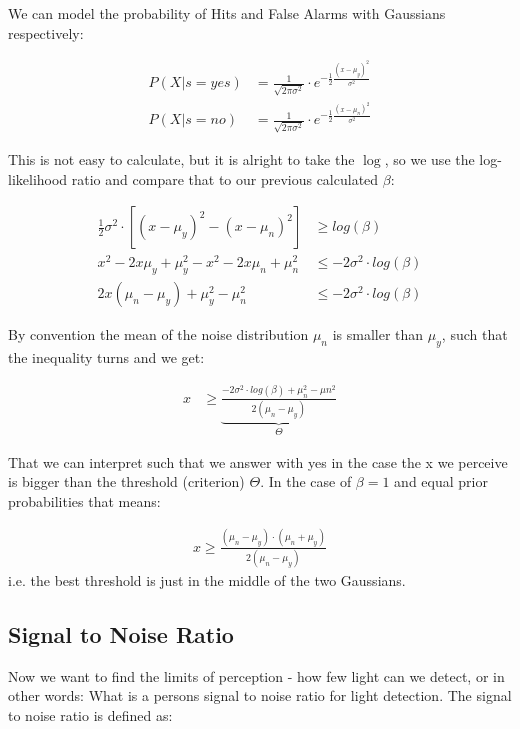 \documentclass[../main/Notes.tex]{subfiles}
\begin{document}
We can model the probability of Hits and False Alarms with Gaussians respectively:

\begin{align*}
  P\left(X|s=yes\right) &= \frac{1}{\sqrt{2\pi \sigma^2}} \cdot e^{-\frac{1}{2}\frac{\left(x-\mu_y\right)^2}{\sigma^2}}\\
  P\left(X|s=no\right) &= \frac{1}{\sqrt{2\pi \sigma^2}} \cdot e^{-\frac{1}{2}\frac{\left(x-\mu_n\right)^2}{\sigma^2}}
\end{align*}

This is not easy to calculate, but it is alright to take the $\log$, so we use the log-likelihood ratio and compare that to our previous calculated $\beta$:

\begin{align*}
 \frac{1}{2}\sigma^2 \cdot \left[\left(x-\mu_y\right)^2 - \left(x-\mu_n\right)^2 \right] &\geq log\left(\beta\right)\\
  x^2 - 2x\mu_y + \mu_{y}^{2} - x^2 - 2x\mu_n + \mu_{n}^{2} &\leq - 2\sigma^2 \cdot log\left(\beta\right)\\
  2x\left(\mu_n - \mu_y\right)+\mu_{y}^{2}-\mu_{n}^{2}&\leq -2\sigma^2\cdot log\left(\beta\right)\end{align*}
  
By convention the mean of the noise distribution $\mu_n$ is smaller than $\mu_y$, such that the inequality turns and we get:

\begin{align*}
  x  &\geq \underbrace{\frac{-2\sigma^2 \cdot log\left(\beta\right) + \mu_{n}^{2}-\mu{n}^{2}}{2\left(\mu_n-\mu_y\right)}}_{\Theta}
\end{align*}

That we can interpret such that we answer with yes in the case the x we perceive is bigger than the threshold (criterion) $\Theta$.
In the case of $\beta = 1$ and equal prior probabilities that means:

\begin{align*}
  x \geq \frac{\left(\mu_n-\mu_y\right)\cdot \left(\mu_n+\mu_y\right)}{2\left(\mu_n-\mu_y\right)}
\end{align*}
i.e. the best threshold is just in the middle of the two Gaussians.

\newpage

\subsection{Signal to Noise Ratio}

Now we want to find the limits of perception - how few light can we detect, or in other words: What is a persons signal to noise ratio for light detection.
The signal to noise ratio is defined as:
\end{document}
